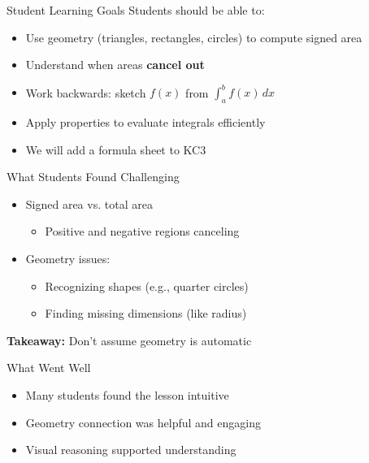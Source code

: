 \documentclass[dvipsnames]{beamer}
\begin{document}
\begin{frame}{Student Learning Goals}
Students should be able to:
\begin{itemize}
\item Use geometry (triangles, rectangles, circles) to compute signed area
\item Understand when areas \textbf{cancel out}
\item Work backwards: sketch $f(x)$ from $\int_a^b f(x)\,dx$
\item Apply properties to evaluate integrals efficiently
\item We will add a formula sheet to KC3
\end{itemize}
\end{frame}

\begin{frame}{What Students Found Challenging}
\begin{itemize}
\item Signed area vs. total area
\begin{itemize}
\item Positive and negative regions canceling
\end{itemize}

\item Geometry issues:
\begin{itemize}
\item Recognizing shapes (e.g., quarter circles)
\item Finding missing dimensions (like radius)
\end{itemize}
\end{itemize}

\vspace{0.3cm}

\textbf{Takeaway:} Don’t assume geometry is automatic
\end{frame}

\begin{frame}{What Went Well}
\begin{itemize}
\item Many students found the lesson intuitive
\item Geometry connection was helpful and engaging
\item Visual reasoning supported understanding
\end{itemize}
\end{frame}
\end{document}
